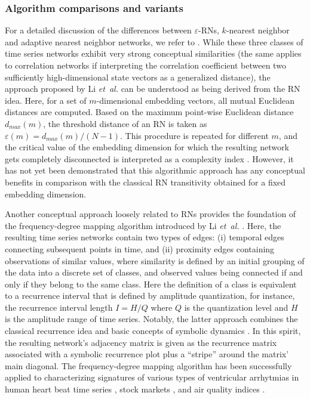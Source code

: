 		\subsubsection{Algorithm comparisons and variants}
		For a detailed discussion of the differences between $\varepsilon$-RNs, $k$-nearest neighbor and adaptive nearest neighbor networks, we refer to \cite{Donner2011}. While these three classes of time series networks exhibit very strong conceptual similarities (the same applies to correlation networks \cite{Yang2008} if interpreting the correlation coefficient between two sufficiently high-dimensional state vectors as a generalized distance), the approach proposed by Li \textit{et~al.} \cite{Li2011a,Li2011b,Cao2014,Fan2015} can be understood as being derived from the RN idea. Here, for a set of $m$-dimensional embedding vectors, all mutual Euclidean distances are computed. Based on the maximum point-wise Euclidean distance $d_{max}(m)$, the threshold distance of an RN is taken as $\varepsilon(m)=d_{max}(m)/(N-1)$. This procedure is repeated for different $m$, and the critical value of the embedding dimension for which the resulting network gets completely disconnected is interpreted as a complexity index \cite{Cao2014}. However, it has not yet been demonstrated that this algorithmic approach has any conceptual benefits in comparison with the classical RN transitivity obtained for a fixed embedding dimension.

		Another conceptual approach loosely related to RNs provides the foundation of the frequency-degree mapping algorithm introduced by Li \textit{et~al.} \cite{Li2012}. Here, the resulting time series networks contain two types of edges: (i) temporal edges connecting subsequent points in time, and (ii) proximity edges containing observations of similar values, where similarity is defined by an initial grouping of the data into a discrete set of classes, and observed values being connected if and only if they belong to the same class. Here the definition of a class is equivalent to a recurrence interval that is defined by amplitude quantization, for instance, the recurrence interval length $I = H/Q$ where $Q$ is the quantization level and $H$ is the amplitude range of time series. Notably, the latter approach combines the classical recurrence idea and basic concepts of symbolic dynamics \cite{Daw2003}. In this spirit, the resulting network's adjacency matrix is given as the recurrence matrix associated with a symbolic recurrence plot \cite{Donner2008,Faure2010,graben2013} plus a ``stripe'' around the matrix' main diagonal. The frequency-degree mapping algorithm has been successfully applied to characterizing signatures of various types of ventricular arrhytmias in human heart beat time series \cite{Li2012}, stock markets \cite{Cao2014}, and air quality indices \cite{Fan2015}.

